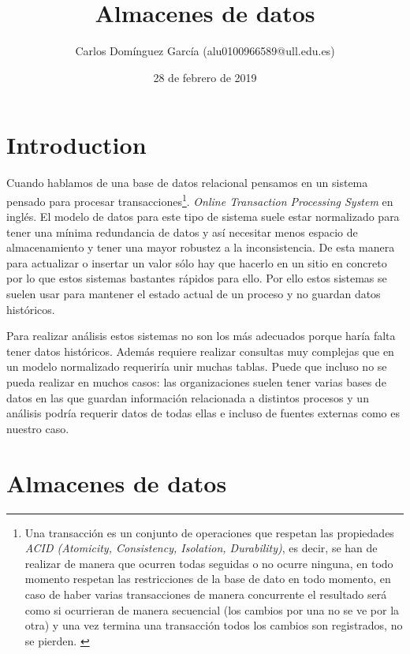 \documentclass[12pt]{article}
\title{Almacenes de datos}
\author{Carlos Domínguez García (alu0100966589@ull.edu.es)}
\date{28 de febrero de 2019}
\begin{document}
  \maketitle
  \pagebreak
  
  \tableofcontents
  \pagebreak

  \section{Introduction}
    Cuando hablamos de una base de datos relacional pensamos en un sistema pensado para procesar transacciones\footnote{Una transacción es un conjunto de operaciones que respetan las propiedades \textit{ACID (Atomicity, Consistency, Isolation, Durability)}, es decir, se han de realizar de manera que ocurren todas seguidas o no ocurre ninguna, en todo momento respetan las restricciones de la base de dato en todo momento, en caso de haber varias transacciones de manera concurrente el resultado será como si ocurrieran de manera secuencial (los cambios por una no se ve por la otra) y una vez termina una transacción todos los cambios son registrados, no se pierden. \cite{Stackoverflow_AcidAndDatabaseTransactions}}. \textit{Online Transaction Processing System} en inglés.
    El modelo de datos para este tipo de sistema suele estar normalizado para tener una mínima redundancia de datos y así necesitar menos espacio de almacenamiento y tener una mayor robustez a la inconsistencia. De esta manera para actualizar o insertar un valor sólo hay que hacerlo en un sitio en concreto por lo que estos sistemas bastantes rápidos para ello. Por ello estos sistemas se suelen usar para mantener el estado actual de un proceso y no guardan datos históricos.

    Para realizar análisis estos sistemas no son los más adecuados porque haría falta tener datos históricos. Además requiere realizar consultas muy complejas que en un modelo normalizado requeriría unir muchas tablas. Puede que incluso no se pueda realizar en muchos casos: las organizaciones suelen tener varias bases de datos en las que guardan información relacionada a distintos procesos y un análisis podría requerir datos de todas ellas e incluso de fuentes externas como es nuestro caso.
  
  \section{Almacenes de datos}

  \printbibliography
  
\end{document}
